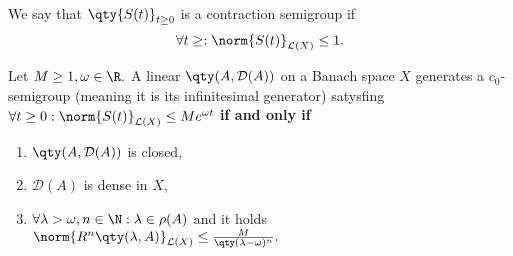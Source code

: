 \begin{definition}
	We say that $\qty{S(t)}_{t\geq 0}$ is a contraction semigroup if
	\[
		\forall t\geq: \norm{S(t)}_{\mathcal{L}(X)} \leq 1.
	\]
\end{definition}

\begin{theorem}
	Let $M \geq 1, \omega \in \R.$ A linear $\qty(A, \mathcal{D}(A))$ on a Banach space $X$ generates a $c_0$-semigroup (meaning it is its infinitesimal generator) satysfing $\forall t \geq 0: \norm{S(t)}_{\mathcal{L}(X)} \leq Me^{\omega t}$ \textbf{if and only if}
	\begin{enumerate}
		\item $\qty(A, \mathcal{D}(A))$ is closed,
		\item $\mathcal{D}(A)$ is dense in $X$,
		\item $\forall \lambda > \omega, n \in \N: \lambda \in \rho(A)$ and it holds $\norm{R^n\qty(\lambda,A)}_{\mathcal{L}(X)} \leq \frac{M}{\qty(\lambda-\omega)^n}.$
	\end{enumerate}
\end{theorem}
